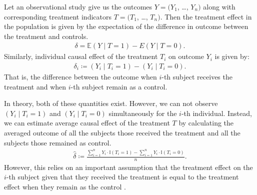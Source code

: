 \documentclass{amsart}
\begin{document}
Let an observational study give us the outcomes $Y=(Y_1$, \dots, $Y_n)$ along with 
corresponding treatment indicators $T=(T_1$, \dots, $T_n)$. Then the
treatment 
effect in the population is given by the expectation of the difference
in outcome between the treatment and controls. 
\begin{align}
\delta = \mathbb{E}(Y\mid T =1) - E(Y\mid T=0).
\end{align}
Similarly, individual causal
effect of the treatment $T_i$ on outcome $Y_i$ is given by:
\begin{align}
\delta_i \coloneqq (Y_i\mid T_i=1) - (Y_i\mid T_i=0).
\end{align}
That is, the difference between the outcome when $i$-th subject receives
the treatment and when $i$-th subject remain as a control. 

In theory, both of these quantities exist.
However, we can not observe $(Y_i\mid T_i=1)$ and $(Y_i\mid T_i=0)$
simultaneously for the $i$-th individual. Instead, we can estimate
average causal effect of the treatment $T$ by calculating the averaged
outcome of all the subjects those received the treatment and
all the subjects those remained as control.
\begin{align}
\hat{\delta} \coloneqq 
\frac{\sum_{i=1}^n Y_i\cdot\mathbb{I}(T_i=1) - 
	\sum_{i=1}^n Y_i\cdot\mathbb{I}(T_i=0)}{n}.
\end{align}
However, this relies on an important assumption that the treatment effect
on the $i$-th subject given that they received the treatment is
equal to the treatment effect when they remain as the control
\cite{winship99}.
\end{document}
